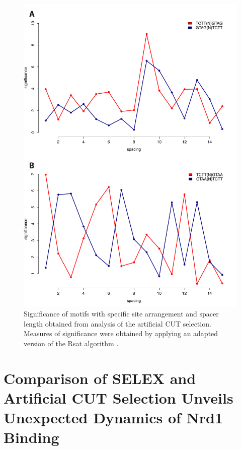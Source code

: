 \begin{figure}[hp!]

\centering
\includegraphics[width=\textwidth]{figures/results/positionalVivo}
\caption[Enrichment of Nrd1 and Nab3 sites with different arrangements and spacings in the artificial CUT selection]{Significance of motifs with specific site arrangement and spacer length obtained from analysis of the artificial CUT selection. Measures of significance were obtained by applying an adapted version of the Rsat algorithm \cite[see methods]{vanhelden:1998:extracting}.}
\label{fig:positionalVivo}

\end{figure} 

\singlespacing
\section{Comparison of SELEX and \invivo{} Artificial CUT Selection Unveils Unexpected Dynamics of Nrd1 Binding}
\doublespacing

